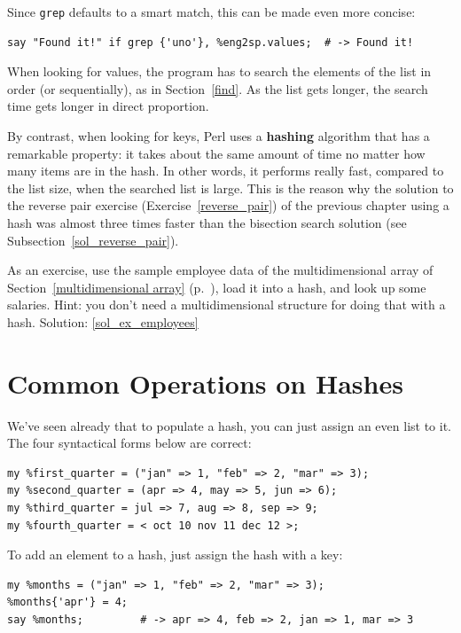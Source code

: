 Since {\tt grep} defaults to a smart match, this can be 
made even more concise:

\begin{verbatim}
say "Found it!" if grep {'uno'}, %eng2sp.values;  # -> Found it!
\end{verbatim}

When looking for values, the program has to search the 
elements of the list in order (or sequentially), as in 
Section~\ref{find}.  As the list gets longer, the search 
time gets longer in direct proportion.

By contrast, when looking for keys, Perl uses a {\bf hashing} 
algorithm that has a remarkable property: it takes about 
the same amount of time no matter how many items are in 
the hash. In other words, it performs really fast, compared 
to the list size, when the 
searched list is large. This is the reason why the solution to 
the reverse pair exercise (Exercise~\ref{reverse_pair}) of the 
previous chapter using a hash was almost three times 
faster than the bisection search solution 
(see Subsection~\ref{sol_reverse_pair}).

\label{ex_employees}
As an exercise, use the sample employee data of the 
multidimensional array of Section~\ref{multidimensional array} 
(p.~\pageref{multidimensional array}), load it into a hash, and 
look up some salaries. Hint: you don't need a 
multidimensional structure for doing that with a hash.
Solution: \ref{sol_ex_employees}


\section{Common Operations on Hashes}

We've seen already that to populate a hash, you can just 
assign an even list to it. The four syntactical forms 
below are correct:

\begin{verbatim}
my %first_quarter = ("jan" => 1, "feb" => 2, "mar" => 3);
my %second_quarter = (apr => 4, may => 5, jun => 6);
my %third_quarter = jul => 7, aug => 8, sep => 9;
my %fourth_quarter = < oct 10 nov 11 dec 12 >;
\end{verbatim}

To add an element to a hash, just assign the hash with a key:

\begin{verbatim}
my %months = ("jan" => 1, "feb" => 2, "mar" => 3);
%months{'apr'} = 4;
say %months;         # -> apr => 4, feb => 2, jan => 1, mar => 3
\end{verbatim}

